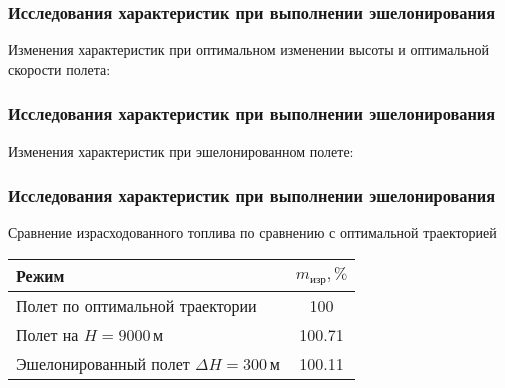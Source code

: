 \documentclass{beamer}
\begin{document}
\begin{frame}[t]
    \frametitle{Исследования характеристик при выполнении эшелонирования}
    \begin{center}
        Изменения характеристик при оптимальном изменении высоты и оптимальной
        скорости полета:

        \begin{minipage}{0.49\textwidth}
            \centering
            \resizebox{1.0\textwidth}{!}{}
        \end{minipage}
        \hfill
        \begin{minipage}{0.49\textwidth}
            \centering
            \resizebox{1.0\textwidth}{!}{}
        \end{minipage}
    \end{center}
\end{frame}

\begin{frame}[t]
    \frametitle{Исследования характеристик при выполнении эшелонирования}
    \begin{center}
        Изменения характеристик при эшелонированном полете: 

        \begin{minipage}{0.49\textwidth}
            \centering
            \resizebox{1.0\textwidth}{!}{}
        \end{minipage}
        \hfill
        \begin{minipage}{0.49\textwidth}
            \centering
            \resizebox{1.0\textwidth}{!}{
            }
        \end{minipage}
    \end{center}
\end{frame}


\begin{frame}[t]
    \frametitle{Исследования характеристик при выполнении эшелонирования}
    \begin{center}

        Сравнение израсходованного топлива по сравнению с
        оптимальной траекторией    

        \begin{tabular}{|p{}|c|}
            \hline
            Режим & $m_{изр}, \%$ \\ 
            \hline
            Полет по оптимальной траектории & 100 \\ 
            \hline
            Полет на $H=9000\,м$ & 100.71 \\
            \hline
            Эшелонированный полет $\Delta H =300\, м$ & 100.11 \\
            \hline
        \end{tabular}
    \end{center}
\end{frame}
\end{document}
